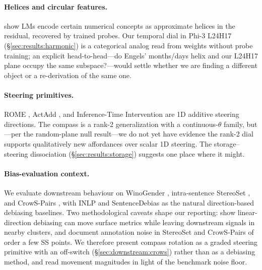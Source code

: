 \paragraph{Helices and circular features.}
\citet{engels2024not} show LMs encode certain numerical concepts as
approximate helices in the residual, recovered by trained probes.
Our temporal dial in Phi-3 L24H17 (\S\ref{sec:results:harmonic}) is
a categorical analog read from weights without probe training; an
explicit head-to-head---do Engels' months/days helix and our L24H17
plane occupy the same subspace?---would settle whether we are
finding a different object or a re-derivation of the same one.

\paragraph{Steering primitives.}
ROME \citep{meng2022rome}, ActAdd \citep{turner2023actadd}, and
Inference-Time Intervention \citep{li2023inference} are 1D additive
steering directions. The compass is a rank-2 generalization with a
continuous-$\theta$ family, but---per the random-plane null
result---we do not yet have evidence the rank-2 dial supports
qualitatively new affordances over scalar 1D steering. The
storage--steering dissociation (\S\ref{sec:results:storage})
suggests one place where it might.

\paragraph{Bias-evaluation context.}
We evaluate downstream behaviour on WinoGender
\citep{rudinger2018winogender,zhao2018winogender}, intra-sentence
StereoSet \citep{nadeem2021stereoset}, and CrowS-Pairs
\citep{nangia2020crowspairs}, with INLP \citep{ravfogel2020inlp}
and SentenceDebias \citep{liang2020sentdebias} as the natural
direction-based debiasing baselines. Two methodological caveats
shape our reporting: \citet{gonen2019lipstick} show linear-direction
debiasing can move surface metrics while leaving downstream signals
in nearby clusters, and \citet{blodgett2021stereotyping} document
annotation noise in StereoSet and CrowS-Pairs of order a few SS
points. We therefore present compass rotation as a graded
steering primitive with an off-switch (\S\ref{sec:downstream:crows})
rather than as a debiasing method, and read movement magnitudes
in light of the benchmark noise floor.
